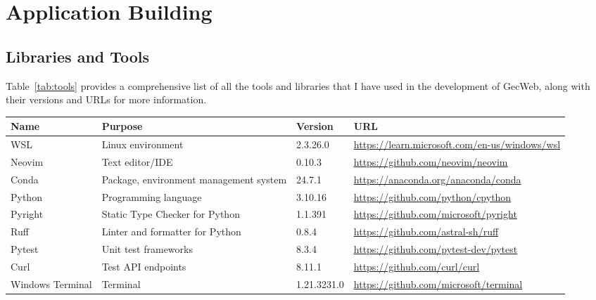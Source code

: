 \section{Application Building}

\subsection{Libraries and Tools}

Table~\ref{tab:tools} provides a comprehensive list of all the tools and libraries that I have used in the development of GecWeb, along with their versions and URLs for more information.

\begin{sidewaystable}[htbp]
  \caption{Tools and libraries}\label{tab:tools}
  \raggedleft
  \begin{tabular}{|l|l|l|l|}
    \hline
    Name             & Purpose                                & Version     & URL                                                 \\ \hline
    WSL              & Linux environment                      & 2.3.26.0    & \url{https://learn.microsoft.com/en-us/windows/wsl} \\ \hline
    Neovim           & Text editor/IDE                        & 0.10.3      & \url{https://github.com/neovim/neovim}              \\ \hline
    Conda            & Package, environment management system & 24.7.1      & \url{https://anaconda.org/anaconda/conda}           \\ \hline
    Python           & Programming language                   & 3.10.16     & \url{https://github.com/python/cpython}             \\ \hline
    Pyright          & Static Type Checker for Python         & 1.1.391     & \url{https://github.com/microsoft/pyright}          \\ \hline
    Ruff             & Linter and formatter for Python        & 0.8.4       & \url{https://github.com/astral-sh/ruff}             \\ \hline
    Pytest           & Unit test frameworks                   & 8.3.4       & \url{https://github.com/pytest-dev/pytest}          \\ \hline
    Curl             & Test API endpoints                     & 8.11.1      & \url{https://github.com/curl/curl}                  \\ \hline
    Windows Terminal & Terminal                               & 1.21.3231.0 & \url{https://github.com/microsoft/terminal}         \\ \hline

\end{tabular}
\end{sidewaystable}
